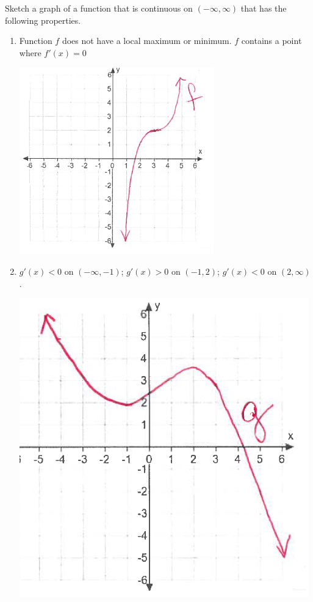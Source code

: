 \documentclass[nooutcomes]{ximera}
\begin{document}
\begin{problem}
Sketch a graph of a function that is continuous on $(-\infty,\infty)$ that has the following properties.
	\begin{enumerate}
	\item Function $f$ does not have a local maximum or minimum.  $f$ contains a point where $f'(x)=0$
	
	
\begin{freeResponse} \hfil
            \begin{image}
              \includegraphics[scale = 0.7]{figure11.png}
            \end{image}	
\end{freeResponse}	
	
	\item $g'(x)<0$ on $(-\infty, -1)$; $g'(x)>0$ on $(-1,2)$; $g'(x)<0$ on $(2,\infty)$.

\begin{freeResponse} \hfil
	            \begin{image}
              \includegraphics[scale = 0.5]{figure6.png}
            \end{image}
\end{freeResponse}		
	

\end{enumerate}
\end{problem}
\end{document}
